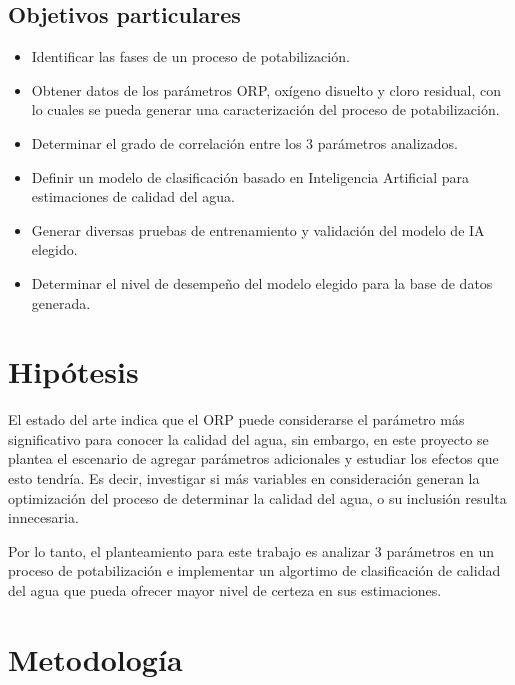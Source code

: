 \subsection{Objetivos particulares}
\begin{itemize} 
	\item Identificar las fases de un proceso de potabilización.
	\item Obtener datos de los parámetros ORP, oxígeno disuelto y cloro residual, con lo cuales se pueda generar una caracterización del proceso de potabilización.
	\item Determinar el grado de correlación entre los 3 parámetros analizados.
	\item Definir un modelo de clasificación basado en Inteligencia 
	Artificial para estimaciones de calidad del agua.
	\item Generar diversas pruebas de entrenamiento y validación del modelo de IA elegido.
	\item Determinar el nivel de desempeño del modelo elegido para la base de datos generada.
\end{itemize}

\section{Hipótesis}

El estado del arte indica que el ORP puede considerarse el parámetro más significativo
para conocer la calidad del agua, sin embargo, en este proyecto se plantea el 
escenario de agregar parámetros adicionales y estudiar los efectos que esto
tendría. Es decir, investigar si más variables en consideración generan 
la optimización del proceso de determinar la calidad del agua, o su inclusión
resulta innecesaria.

Por lo tanto, el planteamiento para este trabajo es analizar 3 parámetros en un proceso de potabilización e implementar un algortimo de clasificación de calidad del agua que pueda ofrecer mayor nivel de certeza en sus 
estimaciones.


\section{Metodología}

